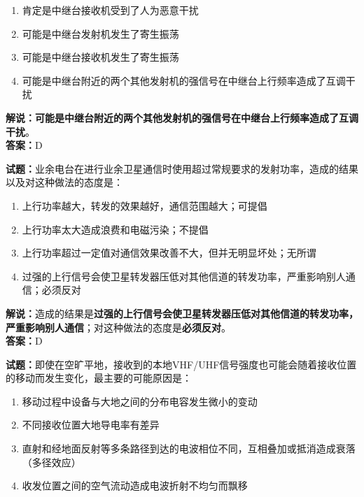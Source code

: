 \documentclass{ctexbook}
\begin{document}
\begin{enumerate}[leftmargin=3em]
  \item 肯定是中继台接收机受到了人为恶意干扰
  \item 可能是中继台发射机发生了寄生振荡
  \item 可能是中继台接收机发生了寄生振荡
  \item 可能是中继台附近的两个其他发射机的强信号在中继台上行频率造成了互调干扰
\end{enumerate}

\noindent\textbf{解说：可能是中继台附近的两个其他发射机的强信号在中继台上行频率造成了互调干扰}。\\\noindent\textbf{答案：}D%

\vspace{\baselineskip}

\noindent\textbf{试题：}业余电台在进行业余卫星通信时使用超过常规要求的发射功率，造成的结果以及对这种做法的态度是：

\begin{enumerate}[leftmargin=3em]
  \item 上行功率越大，转发的效果越好，通信范围越大；可提倡
  \item 上行功率太大造成浪费和电磁污染；不提倡
  \item 上行功率超过一定值对通信效果改善不大，但并无明显坏处；无所谓
  \item 过强的上行信号会使卫星转发器压低对其他信道的转发功率，严重影响别人通信；必须反对
\end{enumerate}

\noindent\textbf{解说：}造成的结果是\textbf{过强的上行信号会使卫星转发器压低对其他信道的转发功率，严重影响别人通信}；对这种做法的态度是\textbf{必须反对}。\\\noindent\textbf{答案：}D%

\vspace{\baselineskip}

\noindent\textbf{试题：}即使在空旷平地，接收到的本地VHF/UHF信号强度也可能会随着接收位置的移动而发生变化，最主要的可能原因是：

\begin{enumerate}[leftmargin=3em]
  \item 移动过程中设备与大地之间的分布电容发生微小的变动
  \item 不同接收位置大地导电率有差异
  \item 直射和经地面反射等多条路径到达的电波相位不同，互相叠加或抵消造成衰落（多径效应）
  \item 收发位置之间的空气流动造成电波折射不均匀而飘移
\end{enumerate}
\end{document}
